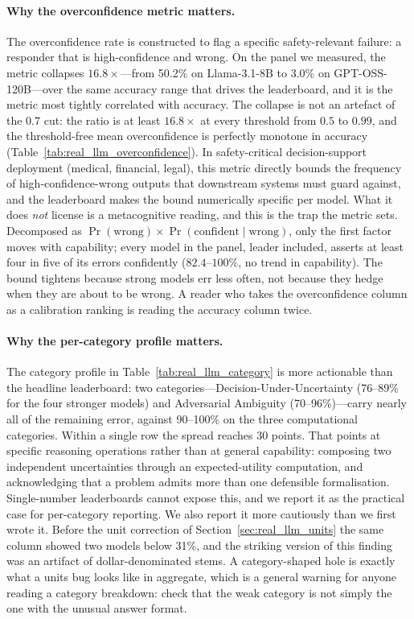 \documentclass{article}
\begin{document}
\paragraph{Why the overconfidence metric matters.}
The overconfidence rate is constructed to flag a specific safety-relevant failure: a responder that is high-confidence and wrong. On the panel we measured, the metric collapses $16.8\times$---from 50.2\% on Llama-3.1-8B to 3.0\% on GPT-OSS-120B---over the same accuracy range that drives the leaderboard, and it is the metric most tightly correlated with accuracy. The collapse is not an artefact of the $0.7$ cut: the ratio is at least $16.8\times$ at every threshold from $0.5$ to $0.99$, and the threshold-free mean overconfidence is perfectly monotone in accuracy (Table~\ref{tab:real_llm_overconfidence}). In safety-critical decision-support deployment (medical, financial, legal), this metric directly bounds the frequency of high-confidence-wrong outputs that downstream systems must guard against, and the leaderboard makes the bound numerically specific per model. What it does \emph{not} license is a metacognitive reading, and this is the trap the metric sets. Decomposed as $\Pr(\text{wrong}) \times \Pr(\text{confident} \mid \text{wrong})$, only the first factor moves with capability; every model in the panel, leader included, asserts at least four in five of its errors confidently ($82.4$--$100\%$, no trend in capability). The bound tightens because strong models err less often, not because they hedge when they are about to be wrong. A reader who takes the overconfidence column as a calibration ranking is reading the accuracy column twice.

\paragraph{Why the per-category profile matters.}
The category profile in Table~\ref{tab:real_llm_category} is more actionable than the headline leaderboard: two categories---Decision-Under-Uncertainty (76--89\% for the four stronger models) and Adversarial Ambiguity (70--96\%)---carry nearly all of the remaining error, against 90--100\% on the three computational categories. Within a single row the spread reaches 30 points. That points at specific reasoning operations rather than at general capability: composing two independent uncertainties through an expected-utility computation, and acknowledging that a problem admits more than one defensible formalisation. Single-number leaderboards cannot expose this, and we report it as the practical case for per-category reporting. We also report it more cautiously than we first wrote it. Before the unit correction of Section~\ref{sec:real_llm_units} the same column showed two models below 31\%, and the striking version of this finding was an artifact of dollar-denominated stems. A category-shaped hole is exactly what a units bug looks like in aggregate, which is a general warning for anyone reading a category breakdown: check that the weak category is not simply the one with the unusual answer format.
\end{document}
